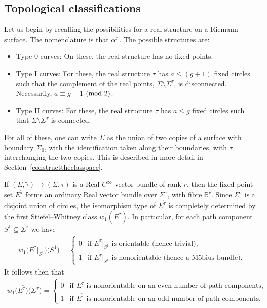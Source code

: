 \documentclass[pdftex]{sigma}
\numberwithin{equation}{section}
\begin{document}
\subsection{Topological classif\/ications}\label{Review}

Let us begin by recalling the possibilities for a real structure on a Riemann surface. The nomenclature is that of \cite{BHH}. The possible structures are:
\begin{itemize}\itemsep=0pt
\item {Type 0 curves}: On these, the real structure has no f\/ixed points.
\item{Type I curves}: For these, the real structure $\tau$ has $a\leq (g+1)$ f\/ixed circles such that the complement of the real points, $\Sigma \setminus \Sigma^{\tau}$, is disconnected. Necessarily, $a \equiv g+1$ $({\rm mod}~2)$.
\item{Type II curves}: For these, the real structure $\tau$ has $a \leq g$ f\/ixed circles such that $\Sigma \setminus \Sigma^{\tau}$ is connected.
\end{itemize}
For all of these, one can write $\Sigma$ as the union of two copies of a surface with boundary $\Sigma_0$, with the identif\/ication taken along their boundaries, with $\tau$ interchanging the two copies. This is described in more detail in Section~\ref{constructtheclasspace}.

If $(E,\tilde{\tau})\rightarrow (\Sigma, \tau)$ is a Real $C^{\infty}$-vector bundle of rank $r$, then the f\/ixed point set $E^{\tilde{\tau}}$ forms an ordinary Real vector bundle over $\Sigma^{\tau}$, with f\/ibre ${\mathbb R}^r$. Since $\Sigma^{\tau}$ is a disjoint union of circles, the isomorphism type of $E^{\tilde{\tau}}$ is completely determined by the f\/irst Stiefel--Whitney class $w_1(E^{\tilde{\tau}})$. In particular, for each path component $S^1 \subseteq \Sigma^{\tau}$ we have
\begin{gather*} w_1\big(E^{\tilde{\tau}}|_{S^1}\big)\big(S^1\big) = \begin{cases} 0 & \text{if $E^{\tilde{\tau}}|_{S^1}$ is orientable (hence trivial)}, \\
1 & \text{if $E^{\tilde{\tau}}|_{S^1}$ is nonorientable (hence a M\"obius bundle)}. \end{cases} \end{gather*}
It follows then that
\begin{gather*} w_1\big(E^{\tilde{\tau}}\big)\big(\Sigma^{\tau}\big) = \begin{cases} 0 & \text{if $E^{\tilde{\tau}}$ is nonorientable on an even number of path components}, \\ 1 & \text{if $E^{\tilde{\tau}}$ is nonorientable on an odd number of path components}. \end{cases} \end{gather*}
\end{document}
